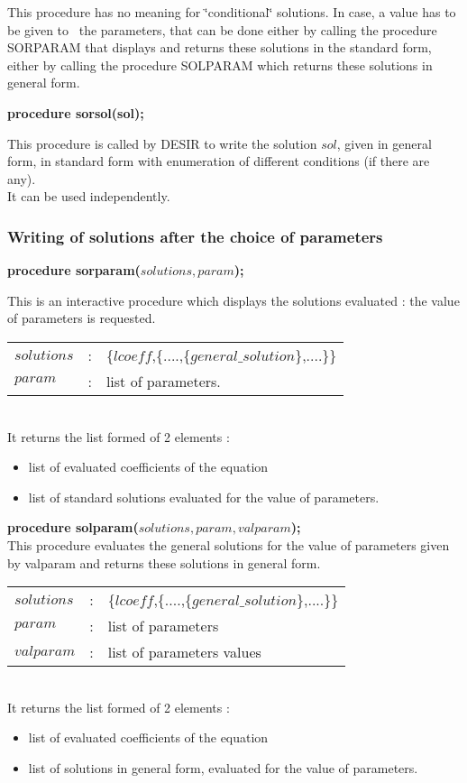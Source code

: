 This procedure has no meaning for \char`\"{}conditional\char`\"{} solutions.
In case, a value has to be given to~ the parameters, that can be done either by 
calling the procedure SORPARAM that displays and returns these solutions in the
standard form, either by calling the procedure SOLPARAM which returns
these solutions in general form.

\textbf{procedure sorsol(sol);} 

This procedure is called by DESIR to write the solution $sol$, given in
general form, in standard form with enumeration of different conditions (if
there are any). \\
It can be used independently.

\subsubsection{Writing of solutions after the choice of parameters}

\textbf{procedure sorparam($solutions,param$);}

This is an interactive procedure which displays the solutions evaluated :
the value of parameters is requested. \\
%
\begin{tabular}{lcl}
$solutions$ & : & \{$lcoeff$,\{....,\{$general\_solution$\},....\}\} \\
$param$ & : & list of parameters.
\end{tabular} \\
%
It returns the list formed of 2 elements :
\begin{itemize}
\item list of evaluated coefficients of the equation
\item list of standard solutions evaluated for the value of parameters.
\end{itemize}

\textbf{procedure solparam($solutions,param,valparam$);} \\
%
This procedure evaluates the general solutions for the value of parameters
given by valparam and returns these solutions in general form. \\
%
\begin{tabular}{lcl}
$solutions$ & : & \{$lcoeff$,\{....,\{$general\_solution$\},....\}\} \\
$param$ & : & list of parameters \\
$valparam$ & : & list of parameters values
\end{tabular} \\
It returns the list formed of 2 elements :
\begin{itemize}
\item list of evaluated coefficients of the equation 
\item list of solutions in general form, evaluated for the value of parameters.
\end{itemize}

